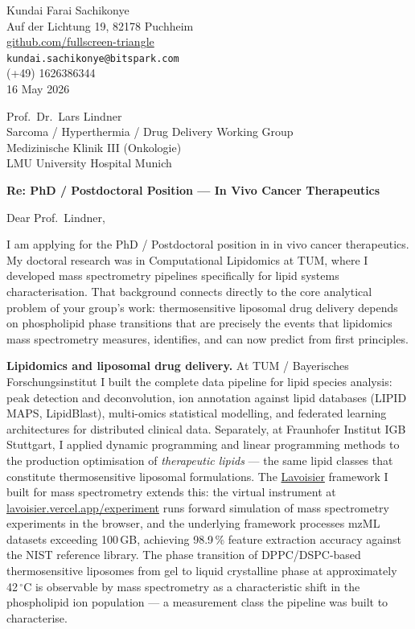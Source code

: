 \documentclass[12pt,a4paper]{article}
\begin{document}
\begin{flushright}
Kundai Farai Sachikonye \\
Auf der Lichtung 19, 82178 Puchheim \\
\href{https://github.com/fullscreen-triangle}{github.com/fullscreen-triangle} \\
\texttt{kundai.sachikonye@bitspark.com} \\
(+49) 1626386344 \\[6pt]
16 May 2026
\end{flushright}

\vspace{1em}

Prof.\ Dr.\ Lars Lindner \\
Sarcoma / Hyperthermia / Drug Delivery Working Group \\
Medizinische Klinik III (Onkologie) \\
LMU University Hospital Munich

\vspace{1.5em}

\textbf{Re: PhD / Postdoctoral Position --- In Vivo Cancer Therapeutics}

\vspace{1em}

Dear Prof.\ Lindner,

I am applying for the PhD / Postdoctoral position in in vivo cancer therapeutics.
My doctoral research was in Computational Lipidomics at TUM, where I developed
mass spectrometry pipelines specifically for lipid systems characterisation. That
background connects directly to the core analytical problem of your group's
work: thermosensitive liposomal drug delivery depends on phospholipid phase
transitions that are precisely the events that lipidomics mass spectrometry
measures, identifies, and can now predict from first principles.

\textbf{Lipidomics and liposomal drug delivery.}
At TUM / Bayerisches Forschungsinstitut I built the complete data pipeline for
lipid species analysis: peak detection and deconvolution, ion annotation against
lipid databases (LIPID MAPS, LipidBlast), multi-omics statistical modelling,
and federated learning architectures for distributed clinical data. Separately,
at Fraunhofer Institut IGB Stuttgart, I applied dynamic programming and linear
programming methods to the production optimisation of \textit{therapeutic lipids}
--- the same lipid classes that constitute thermosensitive liposomal formulations.
The
\href{https://github.com/fullscreen-triangle/lavoisier}{Lavoisier} framework
I built for mass spectrometry extends this: the virtual instrument at
\href{https://lavoisier.vercel.app/experiment}{lavoisier.vercel.app/experiment}
runs forward simulation of mass spectrometry experiments in the browser, and the
underlying framework processes mzML datasets exceeding 100\,GB, achieving 98.9\,\%
feature extraction accuracy against the NIST reference library.
The phase transition of DPPC/DSPC-based thermosensitive liposomes from gel to
liquid crystalline phase at approximately 42\,$^\circ$C is observable by
mass spectrometry as a characteristic shift in the phospholipid ion population
--- a measurement class the pipeline was built to characterise.
\end{document}
